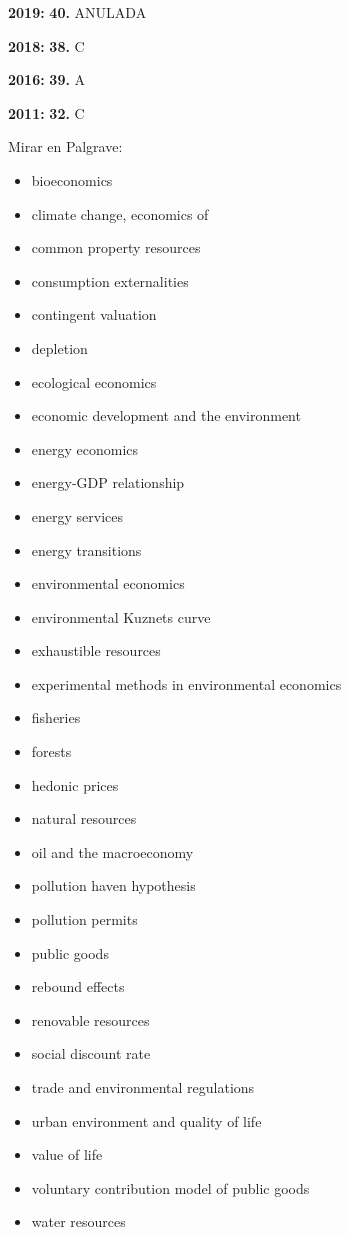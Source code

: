 \documentclass{nuevotema}
\begin{document}
\notas

\textbf{2019:} \textbf{40.} ANULADA

\textbf{2018:} \textbf{38.} C

\textbf{2016:} \textbf{39.} A

\textbf{2011:} \textbf{32.} C

\bibliografia

Mirar en Palgrave:
\begin{itemize}
	\item bioeconomics
	\item climate change, economics of
	\item common property resources
	\item consumption externalities
	\item contingent valuation
	\item depletion
	\item ecological economics
	\item economic development and the environment
	\item energy economics
	\item energy-GDP relationship
	\item energy services
	\item energy transitions
	\item environmental economics
	\item environmental Kuznets curve
	\item exhaustible resources
	\item experimental methods in environmental economics
	\item fisheries
	\item forests
	\item hedonic prices
	\item natural resources
	\item oil and the macroeconomy
	\item pollution haven hypothesis
	\item pollution permits
	\item public goods
	\item rebound effects
	\item renovable resources
	\item social discount rate
	\item trade and environmental regulations
	\item urban environment and quality of life
	\item value of life
	\item voluntary contribution model of public goods
	\item water resources
\end{itemize}
\end{document}
